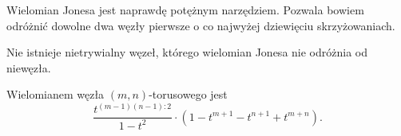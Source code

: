 Wielomian Jonesa jest naprawdę potężnym narzędziem.
Pozwala bowiem odróżnić dowolne dwa węzły pierwsze o co najwyżej dziewięciu skrzyżowaniach.

\begin{hipoteza}
Nie istnieje nietrywialny węzeł, którego wielomian Jonesa nie odróżnia od niewęzła.
\end{hipoteza}

\begin{twierdzenie}
Wielomianem węzła $(m, n)$-torusowego jest
\[
	\frac {t^{(m-1)(n-1):2}}{1-t^2} \cdot (1 - t^{m+1} - t^{n+1} + t^{m+n}).
\]
\end{twierdzenie}